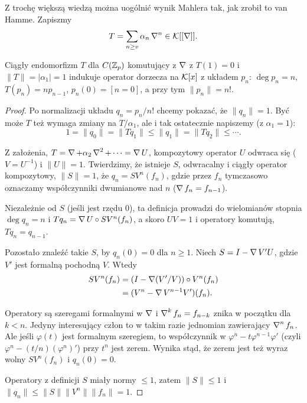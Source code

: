 Z trochę większą wiedzą można uogólnić wynik Mahlera tak, jak zrobił to van Hamme.
Zapiszmy
\[
	T = \sum_{n \ge v} \alpha_n \operatorname{\nabla}^n \in \mathcal K[[\operatorname{\nabla}]].
\]

\begin{fakt}
	Ciągły endomorfizm $T$ dla $C(\mathbb Z_p)$ komutujący z $\operatorname{\nabla}$ z $T(1) = 0$ i $\|T\| = |\alpha_1| = 1$ indukuje operator dorzecza na $\mathcal K[x]$ z układem $p_n$: $\deg p_n = n$, $T(p_n) = np_{n-1}$, $p_n(0) = [n = 0]$, a przy tym $\|p_n\| = n!$.
\end{fakt}

\begin{proof}
	Po normalizacji układu $q_n = p_n / n!$ chcemy pokazać, że $\|q_n\| = 1$.
	Być może $T$ też wymaga zmiany na $T/\alpha_1$, ale i tak ostatecznie napiszemy (z $\alpha_1 = 1$):
	\[
		1 = \|q_0\| = \|Tq_1\| \le \|q_1\| = \|Tq_2\| \le \cdots.
	\]

	Z założenia, $T = \operatorname{\nabla} + \alpha_2 \operatorname{\nabla}^2 + \cdots = \operatorname{\nabla} U$, kompozytowy operator $U$ odwraca się ($V = U^{-1}$) i $\|U\| = 1$.
	Twierdzimy, że istnieje $S$, odwracalny i ciągły operator kompozytowy, $\|S\| = 1$, że $q_n = SV^n (f_n)$, gdzie przez $f_n$ tymczasowo oznaczamy współczynniki dwumianowe nad $n$ ($\operatorname{\nabla} f_n = f_{n-1}$).

	Niezależnie od $S$ (jeśli jest rzędu $0$), ta definicja prowadzi do wielomianów stopnia $\deg q_n = n$ i $Tq_n = \operatorname{\nabla} U \circ SV^n (f_n)$, a skoro $UV = 1$ i operatory komutują, $Tq_n = q_{n-1}$.

	Pozostało znaleźć takie $S$, by $q_n(0) = 0$ dla $n \ge 1$.
	Niech $S = I - \operatorname{\nabla} V' U$, gdzie $V'$ jest formalną pochodną $V$.
	Wtedy
	\begin{align*}
		SV^n(f_n) & = (I - \operatorname{\nabla} (V'/V)) \circ V^n (f_n) \\
		& = (V^n - \operatorname{\nabla} V^{n-1} V') (f_n).
	\end{align*}

	Operatory są szeregami formalnymi w $\operatorname{\nabla}$ i $\operatorname{\nabla}^k f_n = f_{n-k}$ znika w początku dla $k < n$.
	Jedyny interesujący człon to w takim razie jednomian zawierający $\operatorname{\nabla}^n f_n$.
	Ale jeśli $\varphi(t)$ jest formalnym szeregiem, to współczynnik w $\varphi^n - t \varphi^{n-1} \varphi'$ (czyli $\varphi^n - (t/n)(\varphi^n)'$) przy $t^n$ jest zerem.
	Wynika stąd, że zerem jest też wyraz wolny $SV^n(f_n)$ i $q_n(0) = 0$.

	Operatory z definicji $S$ miały normy $\le 1$, zatem $\|S\| \le 1$ i $\|q_n\| \le \|S\| \|V^n\| \|f_n\| = 1$.
\end{proof}

